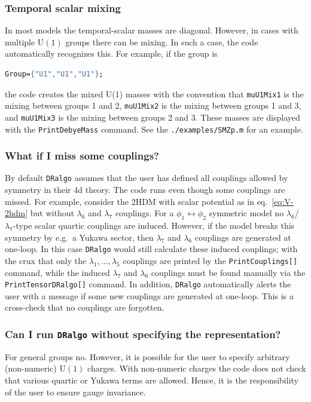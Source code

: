 \documentclass[11pt]{article}
\def\dralgo{{\tt DRalgo}}
\begin{document}
%
\subsubsection{Temporal scalar mixing}
In most models the temporal-scalar masses are diagonal.
However, in cases with multiple $\mathrm{U}(1)$ groups there can be mixing.
In such a case,
the code automatically recognizes this.
For example, if the group is 
\begin{lstlisting}[language=Mathematica,mathescape=true]
Group={"U1","U1","U1"};
\end{lstlisting}
the code creates the mixed U(1) masses with
the convention that
{\tt muU1Mix1} is the mixing between groups 1 and 2, 
{\tt muU1Mix2} is the mixing between groups 1 and 3, and
{\tt muU1Mix3} is the mixing between groups 2 and 3.
These masses are displayed with the {\tt PrintDebyeMass} command.
See the {\tt ./examples/SMZp.m} for an example.

%
\subsubsection{What if I miss some couplings?}
By default \dralgo{} assumes that
the user has defined all couplings allowed by symmetry in their 4d theory.
The code runs even though some couplings are missed.
For example, consider
the 2HDM with scalar potential as in eq.~\eqref{eq:V-2hdm} but 
without
$\lambda_6$ and
$\lambda_7$ couplings.
For a
$\phi_1 \leftrightarrow \phi_2$ symmetric model no
$\lambda_6$/$\lambda_7$-type scalar quartic couplings are induced.
However,
if the model breaks this symmetry by e.g.\ a Yukawa sector, then
$\lambda_7$ and
$\lambda_6$ couplings are generated at one-loop.
In this case \dralgo{} would still calculate these induced couplings;
with the crux that only the
$\lambda_1,\ldots,\lambda_5$ couplings are printed by
the {\tt PrintCouplings[]} command,
while the induced
$\lambda_7$ and 
$\lambda_6$ couplings must be found manually via
the {\tt PrintTensorDRalgo[]} command. 
In addition, \dralgo{} automatically alerts the user with a message
if some new couplings are generated at one-loop.
This is a cross-check that no couplings are forgotten.


%
\subsubsection{Can I run \dralgo{} without specifying the representation?}
For general groups no.
However, it is possible for the user to specify arbitrary (non-numeric)
$\mathrm{U}(1)$ charges.
With non-numeric charges the code does not check that various
quartic or
Yukawa terms are allowed.
Hence, it is the responsibility of the user to ensure gauge invariance.
\end{document}

